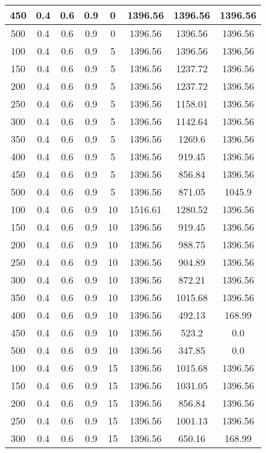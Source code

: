 \documentclass[a4paper, 12pt]{extreport}
\begin{document}
\begin{itemize}
\begin{longtable}{|c|c|c|c|c|c|c|c|}
			450 & 0.4 & 0.6 & 0.9 & 0 & 1396.56 & 1396.56 & 1396.56 \\\hline
			500 & 0.4 & 0.6 & 0.9 & 0 & 1396.56 & 1396.56 & 1396.56 \\\hline
			100 & 0.4 & 0.6 & 0.9 & 5 & 1396.56 & 1396.56 & 1396.56 \\\hline
			150 & 0.4 & 0.6 & 0.9 & 5 & 1396.56 & 1237.72 & 1396.56 \\\hline
			200 & 0.4 & 0.6 & 0.9 & 5 & 1396.56 & 1237.72 & 1396.56 \\\hline
			250 & 0.4 & 0.6 & 0.9 & 5 & 1396.56 & 1158.01 & 1396.56 \\\hline
			300 & 0.4 & 0.6 & 0.9 & 5 & 1396.56 & 1142.64 & 1396.56 \\\hline
			350 & 0.4 & 0.6 & 0.9 & 5 & 1396.56 & 1269.6 & 1396.56 \\\hline
			400 & 0.4 & 0.6 & 0.9 & 5 & 1396.56 & 919.45 & 1396.56 \\\hline
			450 & 0.4 & 0.6 & 0.9 & 5 & 1396.56 & 856.84 & 1396.56 \\\hline
			500 & 0.4 & 0.6 & 0.9 & 5 & 1396.56 & 871.05 & 1045.9 \\\hline
			100 & 0.4 & 0.6 & 0.9 & 10 & 1516.61 & 1280.52 & 1396.56 \\\hline
			150 & 0.4 & 0.6 & 0.9 & 10 & 1396.56 & 919.45 & 1396.56 \\\hline
			200 & 0.4 & 0.6 & 0.9 & 10 & 1396.56 & 988.75 & 1396.56 \\\hline
			250 & 0.4 & 0.6 & 0.9 & 10 & 1396.56 & 904.89 & 1396.56 \\\hline
			300 & 0.4 & 0.6 & 0.9 & 10 & 1396.56 & 872.21 & 1396.56 \\\hline
			350 & 0.4 & 0.6 & 0.9 & 10 & 1396.56 & 1015.68 & 1396.56 \\\hline
			400 & 0.4 & 0.6 & 0.9 & 10 & 1396.56 & 492.13 & 168.99 \\\hline
			450 & 0.4 & 0.6 & 0.9 & 10 & 1396.56 & 523.2 & 0.0 \\\hline
			500 & 0.4 & 0.6 & 0.9 & 10 & 1396.56 & 347.85 & 0.0 \\\hline
			100 & 0.4 & 0.6 & 0.9 & 15 & 1396.56 & 1015.68 & 1396.56 \\\hline
			150 & 0.4 & 0.6 & 0.9 & 15 & 1396.56 & 1031.05 & 1396.56 \\\hline
			200 & 0.4 & 0.6 & 0.9 & 15 & 1396.56 & 856.84 & 1396.56 \\\hline
			250 & 0.4 & 0.6 & 0.9 & 15 & 1396.56 & 1001.13 & 1396.56 \\\hline
			300 & 0.4 & 0.6 & 0.9 & 15 & 1396.56 & 650.16 & 168.99 \\\hline

\end{longtable}
\end{itemize}
\end{document}
